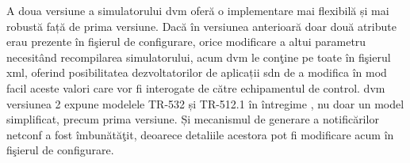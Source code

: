 A doua versiune a simulatorului \gls{dvm} oferă o implementare mai flexibilă și mai robustă față de prima versiune. Dacă în versiunea anterioară doar două atribute erau prezente în fişierul de configurare, orice modificare a altui parametru necesitând recompilarea simulatorului, acum \gls{dvm} le conţine pe toate în fişierul \gls{xml}, oferind posibilitatea dezvoltatorilor de aplicații \gls{sdn} de a modifica în mod facil aceste valori care vor fi interogate de către echipamentul de control. \gls{dvm} versiunea 2 expune modelele TR-532 și TR-512.1 în întregime \cite{stancu2017enabling}, nu doar un model simplificat, precum prima versiune. Și mecanismul de generare a notificărilor \gls{netconf} a fost îmbunătăţit, deoarece detaliile acestora pot fi modificare acum în fişierul de configurare.